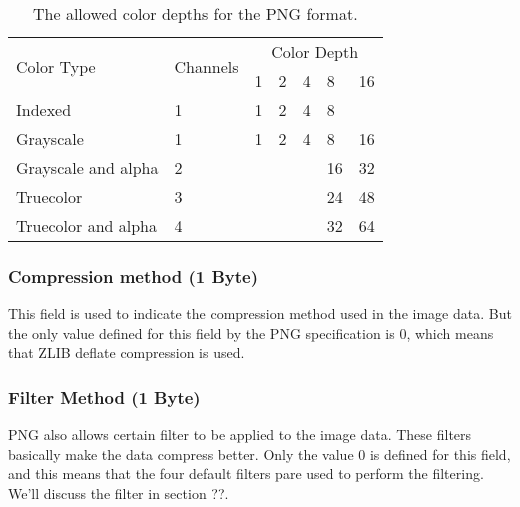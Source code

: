 \begin{table}
  \centering

  \newcommand{\invalid}{\cellcolor{gray}}

  \begin{tabular}{|l|l|l|l|l|l|l|}
    \hline
    \multirow{2}{*}{Color Type} & \multirow{2}{*}{Channels} & \multicolumn{5}{c|}{Color Depth} \\

  \cline{3-7}

    & & 1 & 2 & 4 & 8 & 16 \\

    \hline
    Indexed & 1 & 1 & 2 & 4 & 8 & \invalid \\ \hline
    Grayscale & 1 & 1 & 2 & 4 & 8 & 16  \\ \hline
    Grayscale and alpha & 2 & \invalid& \invalid & \invalid & 16 & 32  \\ \hline
    Truecolor & 3 & \invalid & \invalid & \invalid & 24 & 48  \\ \hline
    Truecolor and alpha & 4 & \invalid & \invalid & \invalid & 32 & 64  \\ \hline

    \hline

  \end{tabular}
  \caption{The allowed color depths for the PNG format.}
  \label{tab:png-color-depths}
\end{table}

\subsubsection*{Compression method (1 Byte)}

This field is used to indicate the compression method used in the
image data. But the only value defined for this field by the PNG
specification is $0$, which means that ZLIB deflate compression is
used.

\subsubsection*{Filter Method (1 Byte)}

PNG also allows certain filter to be applied to the image data. These
filters basically make the data compress better. Only the value $0$ is
defined for this field, and this means that the four default filters
pare used to perform the filtering. We'll discuss the filter in section
??.  

